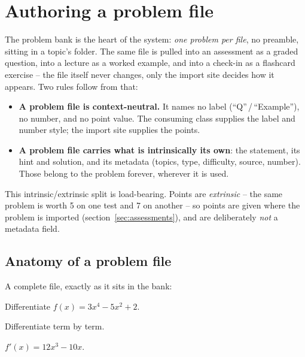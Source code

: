 \section{Authoring a problem file}\label{sec:problem-files}

The problem bank is the heart of the system: \emph{one problem per file}, no
preamble, sitting in a topic's  folder. The same file is pulled
into an assessment as a graded question, into a lecture as a worked example, and
into a check-in as a flashcard exercise -- the file itself never changes, only
the import site decides how it appears. Two rules follow from that:

\begin{itemize}
  \item \textbf{A problem file is context-neutral.} It names no label
    (``Q''\,/\,``Example''), no number, and no point value. The consuming class
    supplies the label and number style; the import site supplies the points.
  \item \textbf{A problem file carries what is intrinsically its own}: the
    statement, its hint and solution, and its metadata (topics, type,
    difficulty, source, number). Those belong to the problem forever, wherever
    it is used.
\end{itemize}

This intrinsic/extrinsic split is load-bearing. Points are \emph{extrinsic} --
the same problem is worth 5 on one test and 7 on another -- so points are given
where the problem is imported (section~\ref{sec:assessments}), and are
deliberately \emph{not} a metadata field.

\subsection{Anatomy of a problem file}

A complete file, exactly as it sits in the bank:

\begin{manexample}
\begin{problem}
  Differentiate $f(x) = 3x^{4} - 5x^{2} + 2$.
\end{problem}
\begin{hint}
  Differentiate term by term.
\end{hint}
\begin{solution}
  $f'(x) = 12x^{3} - 10x$.
\end{solution}
\end{manexample}

